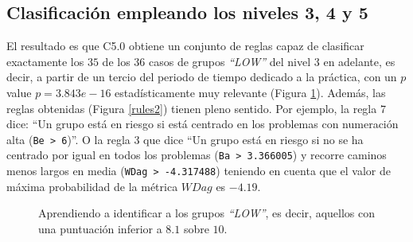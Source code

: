 \subsection{Clasificación empleando los niveles 3, 4 y 5}

El resultado es que C5.0 obtiene un conjunto de reglas capaz de clasificar exactamente los $35$ de los $36$ casos de grupos \emph{``LOW''} del nivel $3$ en adelante, es decir, a partir de un tercio del periodo de tiempo dedicado a la práctica, con un $p$ value $p = 3.843e-16$ estadísticamente muy relevante (Figura \ref{fig:cm2}). Además, las reglas obtenidas (Figura \ref{rules2}) tienen pleno sentido. Por ejemplo, la regla $7$ dice: ``Un grupo está en riesgo si está centrado en los problemas con numeración alta (\texttt{Be > 6})''. O la regla $3$ que dice ``Un grupo está en riesgo si no se ha centrado por igual en todos los problemas (\texttt{Ba > 3.366005}) y recorre caminos menos largos en media (\texttt{WDag > -4.317488}) teniendo en cuenta que el valor de máxima probabilidad de la métrica $WDag$ es $-4.19$.

\begin{figure}[H]
\centering
{}
\caption{Aprendiendo a identificar a los grupos \emph{``LOW''}, es decir, aquellos con una puntuación inferior a $8.1$ sobre $10$.}
\label{fig:cm2}
\end{figure}

